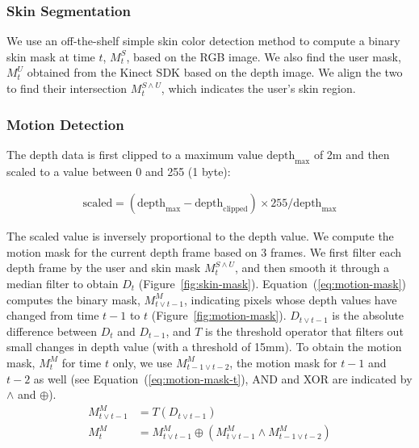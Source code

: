 \subsubsection{Skin Segmentation}
We use an off-the-shelf simple skin color detection method to compute a binary skin mask at
time $t$, $M_t^S$, based on the RGB image. We also find the user mask, $M_t^U$ obtained from the Kinect SDK based on the depth image.
We align the two to find their intersection $M_t^{S\wedge U}$, which indicates the user's skin region.

\subsubsection{Motion Detection}
The depth data is first clipped to a maximum value $\text{depth}_\text{max}$ of
2m and then scaled to a value between 0 and 255 (1 byte):

\begin{align*}
\text{scaled} = (\text{depth}_\text{max} -
\text{depth}_\text{clipped}) \times 255 / \text{depth}_\text{max}
\end{align*}

The scaled value is inversely proportional to the depth value.
We compute the motion mask for the current depth frame based on 3 frames. We first filter each
depth frame by the user and skin mask $M_t^{S\wedge U}$, and then
smooth it through a median filter to obtain $D_t$ (Figure~\ref{fig:skin-mask}).
Equation~(\ref{eq:motion-mask}) computes the binary mask, $M_{t\vee t-1}^M$,
indicating pixels whose depth values have changed from time $t-1$ to $t$ (Figure~\ref{fig:motion-mask}).
$D_{t\vee t-1}$ is the absolute difference between $D_t$ and $D_{t-1}$, and $T$ is the threshold operator that filters out small changes in depth value
(with a threshold of 15mm).
To obtain the motion mask, $M_{t}^M$ for time $t$ only, we use $M_{t-1\vee t-2}^M$, the motion mask for $t-1$ and $t-2$ as well (see Equation~(\ref{eq:motion-mask-t}),
 AND and XOR are indicated by $\wedge$ and $\oplus$).
\begin{align}
M_{t\vee t-1}^M &= T(D_{t\vee t-1}) \label{eq:motion-mask} \\
M_{t}^M &= M_{t\vee t-1}^M \oplus (M_{t\vee t-1}^M \wedge M_{t-1\vee t-2}^M) \label{eq:motion-mask-t}
\end{align}

